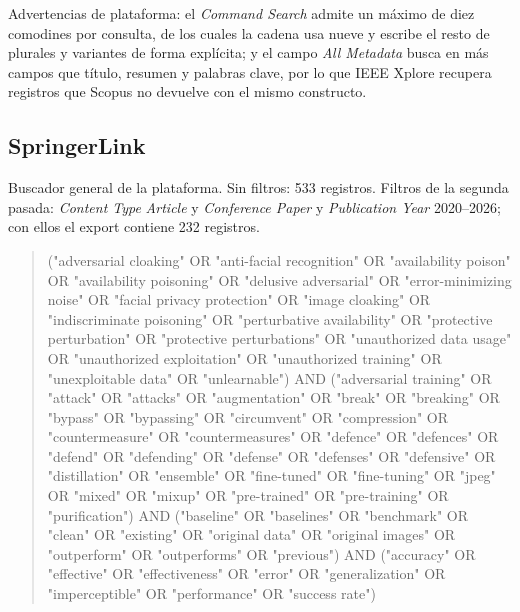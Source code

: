 \documentclass[pdflatex,sn-mathphys-num]{sn-jnl}
\theoremstyle{thmstyleone}
\theoremstyle{thmstyletwo}
\theoremstyle{thmstylethree}
\begin{document}
\begin{appendices}
\begin{quote}
\end{quote}
Advertencias de plataforma: el \emph{Command Search} admite un máximo de diez comodines por consulta, de los cuales la cadena usa nueve y escribe el resto de plurales y variantes de forma explícita; y el campo \emph{All Metadata} busca en más campos que título, resumen y palabras clave, por lo que IEEE Xplore recupera registros que Scopus no devuelve con el mismo constructo.

\subsection{SpringerLink}
Buscador general de la plataforma. Sin filtros: 533 registros. Filtros de la segunda pasada: \emph{Content Type} \emph{Article} y \emph{Conference Paper} y \emph{Publication Year} 2020--2026; con ellos el export contiene 232 registros.
\begin{quote}\footnotesize\ttfamily\raggedright
("adversarial cloaking" OR \allowbreak "anti-facial recognition" OR \allowbreak "availability poison" OR \allowbreak "availability poisoning" OR \allowbreak "delusive adversarial" OR \allowbreak "error-minimizing noise" OR \allowbreak "facial privacy protection" OR \allowbreak "image cloaking" OR \allowbreak "indiscriminate poisoning" OR \allowbreak "perturbative availability" OR \allowbreak "protective perturbation" OR \allowbreak "protective perturbations" OR \allowbreak "unauthorized data usage" OR \allowbreak "unauthorized exploitation" OR \allowbreak "unauthorized training" OR \allowbreak "unexploitable data" OR \allowbreak "unlearnable") AND \allowbreak ("adversarial training" OR \allowbreak "attack" OR \allowbreak "attacks" OR \allowbreak "augmentation" OR \allowbreak "break" OR \allowbreak "breaking" OR \allowbreak "bypass" OR \allowbreak "bypassing" OR \allowbreak "circumvent" OR \allowbreak "compression" OR \allowbreak "countermeasure" OR \allowbreak "countermeasures" OR \allowbreak "defence" OR \allowbreak "defences" OR \allowbreak "defend" OR \allowbreak "defending" OR \allowbreak "defense" OR \allowbreak "defenses" OR \allowbreak "defensive" OR \allowbreak "distillation" OR \allowbreak "ensemble" OR \allowbreak "fine-tuned" OR \allowbreak "fine-tuning" OR \allowbreak "jpeg" OR \allowbreak "mixed" OR \allowbreak "mixup" OR \allowbreak "pre-trained" OR \allowbreak "pre-training" OR \allowbreak "purification") AND \allowbreak ("baseline" OR \allowbreak "baselines" OR \allowbreak "benchmark" OR \allowbreak "clean" OR \allowbreak "existing" OR \allowbreak "original data" OR \allowbreak "original images" OR \allowbreak "outperform" OR \allowbreak "outperforms" OR \allowbreak "previous") AND \allowbreak ("accuracy" OR \allowbreak "effective" OR \allowbreak "effectiveness" OR \allowbreak "error" OR \allowbreak "generalization" OR \allowbreak "imperceptible" OR \allowbreak "performance" OR \allowbreak "success rate")

\end{quote}
\end{appendices}
\end{document}

